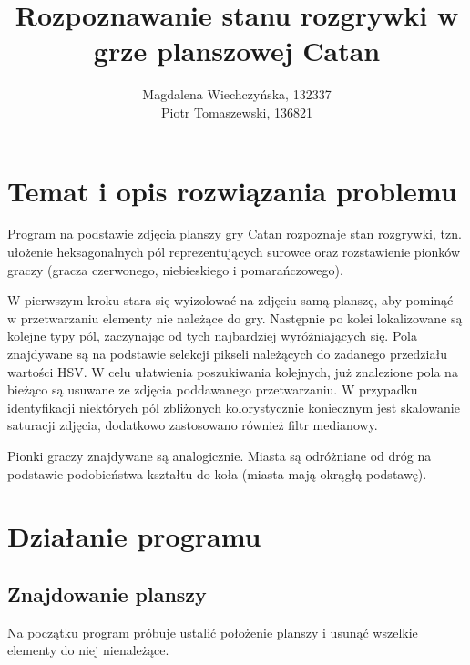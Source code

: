 \documentclass[a4paper]{article}
\title{Rozpoznawanie stanu rozgrywki w grze planszowej Catan}
\author{Magdalena Wiechczyńska, 132337\\
Piotr Tomaszewski, 136821}
\date{} %
\begin{document}
\maketitle

\section{Temat i opis rozwiązania problemu}
	Program na podstawie zdjęcia planszy gry Catan rozpoznaje stan rozgrywki, tzn. ułożenie heksagonalnych pól reprezentujących surowce oraz rozstawienie pionków graczy (gracza czerwonego, niebieskiego i pomarańczowego).
	
	W pierwszym kroku stara się wyizolować na zdjęciu samą planszę, aby pominąć w przetwarzaniu elementy nie należące do gry. Następnie po kolei lokalizowane są kolejne typy pól, zaczynając od
tych najbardziej wyróżniających się. Pola znajdywane są na podstawie selekcji pikseli należących
do zadanego przedziału wartości HSV. W celu ułatwienia poszukiwania kolejnych, już znalezione pola
na bieżąco są usuwane ze zdjęcia poddawanego przetwarzaniu. W przypadku identyfikacji niektórych pól zbliżonych kolorystycznie koniecznym jest skalowanie saturacji zdjęcia, dodatkowo zastosowano również filtr medianowy.

	Pionki graczy znajdywane są analogicznie. Miasta są odróżniane od dróg na podstawie podobieństwa
kształtu do koła (miasta mają okrągłą podstawę).

	
\section{Działanie programu}
    \subsection{Znajdowanie planszy}
    Na początku program próbuje ustalić położenie planszy i usunąć wszelkie elementy do niej nienależące.
\end{document}

